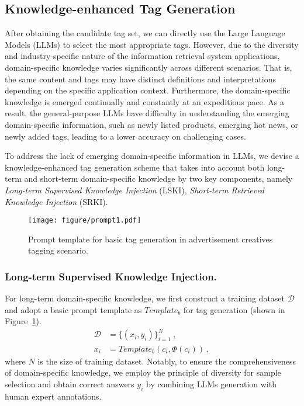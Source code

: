 
\subsection{Knowledge-enhanced Tag Generation}
After obtaining the candidate tag set, we can directly use the Large Language Models (LLMs) to select the most appropriate tags. However, due to the diversity and industry-specific nature of the information retrieval system applications, domain-specific knowledge varies significantly across different scenarios. That is, the same content and tags may have distinct definitions and interpretations depending on the specific application context.
Furthermore, the domain-specific knowledge is emerged continually and constantly at an expeditious pace. As a result, the general-purpose LLMs have difficulty in understanding the emerging domain-specific information, such as newly listed products, emerging hot news, or newly added tags, leading to a lower accuracy on challenging cases.

To address the lack of emerging domain-specific information in LLMs, we devise a knowledge-enhanced tag generation scheme that takes into account both long-term and short-term domain-specific knowledge by two key components, namely \textit{Long-term Supervised Knowledge Injection} (LSKI), \textit{Short-term Retrieved Knowledge Injection} (SRKI).


\begin{figure}[h]
    \centering
    \texttt{[image: figure/prompt1.pdf]}
    \caption{Prompt template for basic tag generation in advertisement creatives tagging scenario.}
    \label{fig:prompt1}
\end{figure}

\subsubsection{Long-term Supervised Knowledge Injection.} For long-term domain-specific knowledge, we first construct a training dataset $\mathcal{D}$ and adopt a basic prompt template as ${Template_b}$ for tag generation (shown in Figure~\ref{fig:prompt1}). 
\begin{equation}
\begin{aligned}
    \mathcal{D} &= \{(x_i, y_i)\}_{i=1}^N~,\\
    x_i &= {Template_b}(c_i, \Phi(c_i))~,
\end{aligned}
\end{equation}
where $N$ is the size of training dataset. Notably, to ensure the comprehensiveness of domain-specific knowledge, we employ the principle of diversity for sample selection and obtain correct answers $y_i$ by combining LLMs generation with human expert annotations.


